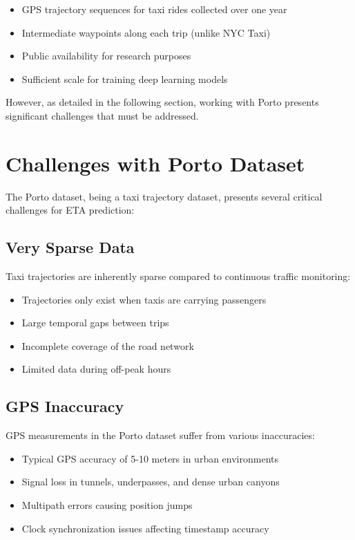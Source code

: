 \documentclass[11pt,a4paper]{article}
\begin{document}
\begin{itemize}
    \item GPS trajectory sequences for taxi rides collected over one year
    \item Intermediate waypoints along each trip (unlike NYC Taxi)
    \item Public availability for research purposes
    \item Sufficient scale for training deep learning models
\end{itemize}

However, as detailed in the following section, working with Porto presents significant challenges that must be addressed.

\section{Challenges with Porto Dataset}

The Porto dataset, being a taxi trajectory dataset, presents several critical challenges for ETA prediction:

\subsection{Very Sparse Data}

Taxi trajectories are inherently sparse compared to continuous traffic monitoring:
\begin{itemize}
    \item Trajectories only exist when taxis are carrying passengers
    \item Large temporal gaps between trips
    \item Incomplete coverage of the road network
    \item Limited data during off-peak hours
\end{itemize}

\subsection{GPS Inaccuracy}

GPS measurements in the Porto dataset suffer from various inaccuracies:
\begin{itemize}
    \item Typical GPS accuracy of 5-10 meters in urban environments
    \item Signal loss in tunnels, underpasses, and dense urban canyons
    \item Multipath errors causing position jumps
    \item Clock synchronization issues affecting timestamp accuracy
\end{itemize}
\end{document}
